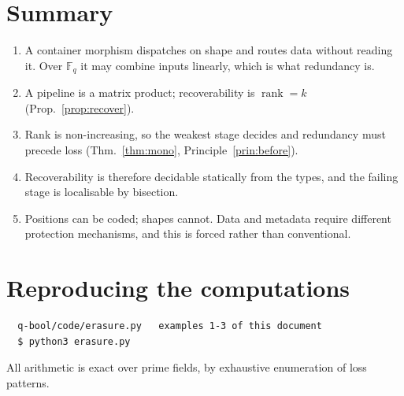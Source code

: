 \documentclass[11pt,a4paper]{article}
\theoremstyle{definition}
\theoremstyle{remark}
\newcommand{\FF}{\mathbb{F}}
\DeclareMathOperator{\rank}{rank}
\begin{document}
\section*{Summary}

\begin{enumerate}[nosep]
  \item A container morphism dispatches on shape and routes data without reading it.
        Over $\FF_q$ it may combine inputs linearly, which is what redundancy is.
  \item A pipeline is a matrix product; recoverability is
        $\rank = k$ (Prop.~\ref{prop:recover}).
  \item Rank is non-increasing, so the weakest stage decides and redundancy must
        precede loss (Thm.~\ref{thm:mono}, Principle~\ref{prin:before}).
  \item Recoverability is therefore decidable statically from the types, and the
        failing stage is localisable by bisection.
  \item Positions can be coded; shapes cannot. Data and metadata require different
        protection mechanisms, and this is forced rather than conventional.
\end{enumerate}

\appendix
\section{Reproducing the computations}

\begin{verbatim}
  q-bool/code/erasure.py   examples 1-3 of this document
  $ python3 erasure.py
\end{verbatim}

\noindent
All arithmetic is exact over prime fields, by exhaustive enumeration of loss patterns.
\end{document}
